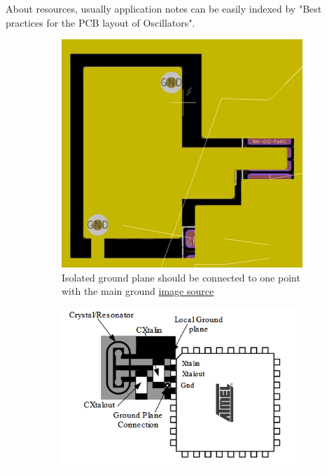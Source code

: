 \documentclass[final]{cubedoc}
\begin{document}
	About resources, usually application notes can be easily indexed by "Best practices for the PCB layout of Oscillators".
	
	
	\begin{figure}[h!]
		\centering
		\begin{subfigure}{.4\textwidth}
			\centering
			\includegraphics[height=0.2\textheight, width=\textwidth]{assets/isolated_gnd.png}
			\caption{Isolated ground plane should be connected to one point with the main ground \href{https://www.youtube.com/watch?v=t5phi3nT8OU&t=4940s}{image source}}
		\end{subfigure}
		\begin{subfigure}{.4\textwidth}
			\centering
			\includegraphics[height=0.2\textheight, width=\textwidth]{assets/layout_clock.png}
			\caption{\cite{atmel:clock}}
		\end{subfigure}
	\end{figure}
	
\end{document}
